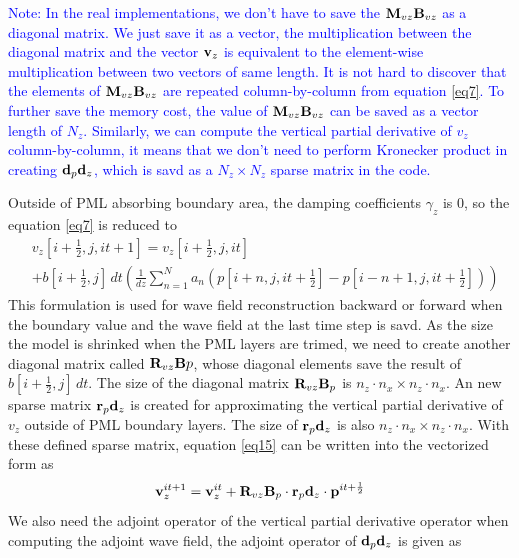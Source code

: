 \documentclass[revised,endfloat]{geophysics}
\begin{document}
\textcolor{blue}{Note: In the real implementations, we don't have to save the ${\bf M}_{vz}{\bf B}_{vz}$ as a diagonal matrix. We just save it as a vector, the multiplication between the diagonal matrix and the vector ${\bf v}_z$ is equivalent to the element-wise multiplication between two vectors of same length. It is not hard to discover that the elements of ${\bf M}_{vz}{\bf B}_{vz}$ are repeated column-by-column from equation \ref{eq7}. To further save the memory cost, the value of ${\bf M}_{vz}{\bf B}_{vz}$ can be saved as a vector length of $N_z$. Similarly, we can compute the vertical partial derivative of $v_z$ column-by-column, it means that we don't need to perform Kronecker product in creating ${\bf d}_p{\bf d}_z$, which is savd as a $N_z \times N_z$ sparse matrix in the code.}

Outside of PML absorbing boundary area, the damping coefficients $\gamma_z$ is $0$, so the equation \ref{eq7} is reduced to 
\begin{equation}
\begin{split}
 &v_z[i+\frac{1}{2},j,it+1] = v_z[i+\frac{1}{2},j,it] \\
 &+ b[i+\frac{1}{2},j] \, dt \left(\frac{1}{dz} \sum_{n=1}^N  a_n \left( p[i+n,j,it+\frac{1}{2}] - p[i-n+1,j,it+\frac{1}{2}] \right)  \right)
\end{split}
\label{eq15}
\end{equation}
This formulation is used for wave field reconstruction backward or forward when the boundary value and the wave field at the last time step is savd. As the size the model is shrinked when the PML layers are trimed, we need to create another diagonal matrix called ${\bf R}_{vz}{\bf B}p$, whose diagonal elements save the result of $b[i+\frac{1}{2},j] \, dt$. The size of the diagonal matrix ${\bf R}_{vz}{\bf B}_p$ is $n_z \cdot n_x \times n_z \cdot n_x$. An new sparse matrix ${\bf r}_p{\bf d}_z$ is created for approximating the vertical partial derivative of $v_z$ outside of PML boundary layers. The size of  ${\bf r}_p{\bf d}_z$ is also $n_z \cdot n_x \times n_z \cdot n_x$. With these defined sparse matrix, equation \ref{eq15} can be written into the vectorized form as 
\begin{equation}
{\bf v}_z^{it+1} =  {\bf v}_z^{it} +  {\bf R}_{vz}{\bf B}_{p} \cdot {\bf r}_p{\bf d}_z \cdot {\bf p}^{it+\frac{1}{2}}
\label{eq16}
\end{equation}
We also need the adjoint operator of the vertical partial derivative operator when computing the adjoint wave field, the adjoint operator of ${\bf d}_p{\bf d}_z$ is given as 
\end{document}
